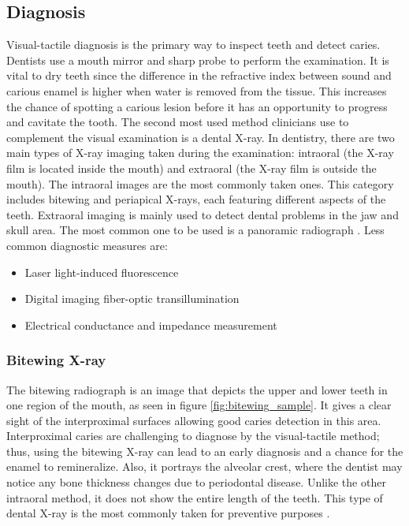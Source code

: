 \subsection{Diagnosis}
Visual-tactile diagnosis is the primary way to inspect teeth and detect caries. Dentists use a mouth mirror and sharp probe to perform the examination. It is vital to dry teeth since the difference in the refractive index between sound and carious enamel is higher when water is removed from the tissue. This increases the chance of spotting a carious lesion before it has an opportunity to progress and cavitate the tooth.
The second most used method clinicians use to complement the visual examination is a dental X-ray. In dentistry, there are two main types of X-ray imaging taken during the examination: intraoral (the X-ray film is located inside the mouth) and extraoral (the X-ray film is outside the mouth). The intraoral images are the most commonly taken ones. This category includes bitewing and periapical X-rays, each featuring different aspects of the teeth. Extraoral imaging is mainly used to detect dental problems in the jaw and skull area. The most common one to be used is a panoramic radiograph \cite{2015}. \newline
Less common diagnostic measures are:

\begin{itemize}
    \item Laser light-induced fluorescence
    \item Digital imaging fiber-optic transillumination
    \item Electrical conductance and impedance measurement
\end{itemize}

\subsubsection{Bitewing X-ray}
The bitewing radiograph is an image that depicts the upper and lower teeth in one region of the mouth, as seen in figure \ref{fig:bitewing_sample}. It gives a clear sight of the interproximal surfaces allowing good caries detection in this area. Interproximal caries are challenging to diagnose by the visual-tactile method; thus, using the bitewing X-ray can lead to an early diagnosis and a chance for the enamel to remineralize. Also, it portrays the alveolar crest, where the dentist may notice any bone thickness changes due to periodontal disease. Unlike the other intraoral method, it does not show the entire length of the teeth. This type of dental X-ray is the most commonly taken for preventive purposes \cite{2015}.


